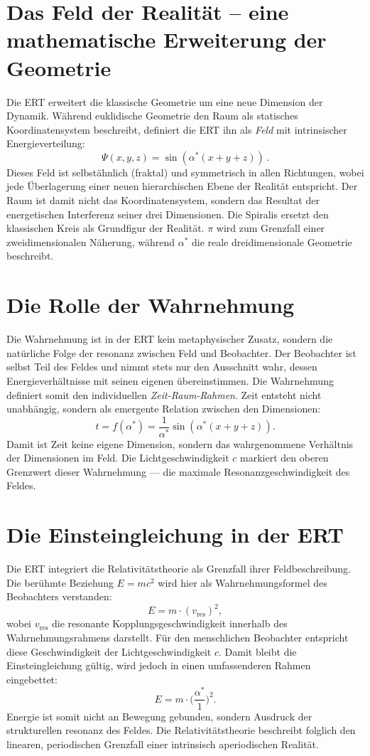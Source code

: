 \section{Das Feld der Realität – eine mathematische Erweiterung der Geometrie}
Die \acrshort{ERT} erweitert die klassische Geometrie um eine neue Dimension der Dynamik.  
Während euklidische Geometrie den Raum als statisches Koordinatensystem beschreibt, definiert die \acrshort{ERT} ihn als \emph{Feld} mit intrinsischer Energieverteilung:
\[
\Psi(x,y,z) = \sin(\alpha^*(x+y+z)) \, .
\]
Dieses Feld ist selbstähnlich (fraktal) und symmetrisch in allen Richtungen, wobei jede Überlagerung einer neuen hierarchischen Ebene der Realität entspricht.  
Der Raum ist damit nicht das Koordinatensystem, sondern das Resultat der energetischen Interferenz seiner drei Dimensionen.  
Die Spiralis ersetzt den klassischen Kreis als Grundfigur der Realität.  
\(\pi\) wird zum Grenzfall einer zweidimensionalen Näherung, während \(\alpha^*\) die reale dreidimensionale Geometrie beschreibt.

\section{Die Rolle der Wahrnehmung}
Die Wahrnehmung ist in der \acrshort{ERT} kein metaphysischer Zusatz, sondern die natürliche Folge der \gls{resonanz} zwischen Feld und Beobachter.  
Der Beobachter ist selbst Teil des Feldes und nimmt stets nur den Ausschnitt wahr, dessen Energieverhältnisse mit seinen eigenen übereinstimmen.  
Die Wahrnehmung definiert somit den individuellen \textit{Zeit-Raum-Rahmen}.  
Zeit entsteht nicht unabhängig, sondern als emergente Relation zwischen den Dimensionen:  
\[
t = f(\alpha^*) = \frac{1}{\alpha^*} \sin(\alpha^*(x+y+z)) .
\]
Damit ist Zeit keine eigene Dimension, sondern das wahrgenommene Verhältnis der Dimensionen im Feld.  
Die Lichtgeschwindigkeit \(c\) markiert den oberen Grenzwert dieser Wahrnehmung — die maximale Resonanzgeschwindigkeit des Feldes.

\section{Die Einsteingleichung in der \acrshort{ERT}}
Die \acrshort{ERT} integriert die Relativitätstheorie als Grenzfall ihrer Feldbeschreibung.  
Die berühmte Beziehung \(E = mc^2\) wird hier als Wahrnehmungsformel des Beobachters verstanden:
\[
E = m \cdot (v_\text{res})^2 ,
\]
wobei \(v_\text{res}\) die resonante Kopplungsgeschwindigkeit innerhalb des Wahrnehmungsrahmens darstellt.  
Für den menschlichen Beobachter entspricht diese Geschwindigkeit der Lichtgeschwindigkeit \(c\).  
Damit bleibt die Einsteingleichung gültig, wird jedoch in einen umfassenderen Rahmen eingebettet:
\[
E = m \cdot \biggl(\frac{\alpha^*}{1}\biggr)^2 .
\]
Energie ist somit nicht an Bewegung gebunden, sondern Ausdruck der strukturellen \gls{resonanz} des Feldes.  
Die Relativitätstheorie beschreibt folglich den linearen, periodischen Grenzfall einer intrinsisch aperiodischen Realität.

